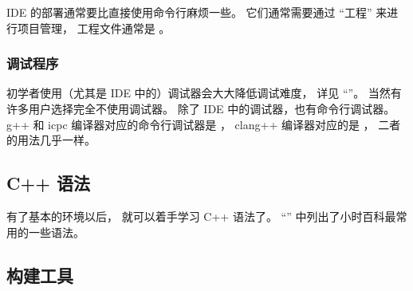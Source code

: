 IDE 的部署通常要比直接使用命令行麻烦一些。 它们通常需要通过 “工程” 来进行项目管理， 工程文件通常是 。

\subsubsection{调试程序}
初学者使用（尤其是 IDE 中的）调试器会大大降低调试难度， 详见 “”。 当然有许多用户选择完全不使用调试器。 除了 IDE 中的调试器，也有命令行调试器。 g++ 和 icpc 编译器对应的命令行调试器是 ， clang++ 编译器对应的是 ， 二者的用法几乎一样。

\subsection{C++ 语法}
有了基本的环境以后， 就可以着手学习 C++ 语法了。 “” 中列出了小时百科最常用的一些语法。

\subsection{构建工具}
